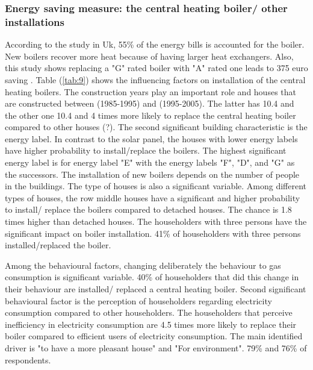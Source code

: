 \documentclass[preprint,12pt,3p]{elsarticle}
\begin{document}
\subsubsection{Energy saving measure: the central heating boiler/ other installations}

According to the study in Uk, 55\% of the energy bills is accounted for the boiler. New boilers recover more heat because of having larger heat exchangers. Also, this study shows replacing a "G" rated boiler with "A" rated one leads to 375 euro saving \citep{boiler19, Energy2019}. Table (\ref{tab:9}) shows the influencing factors on installation of the central heating boilers. The construction years play an important role and houses that are constructed between (1985-1995) and (1995-2005). The latter has 10.4 and the other one 10.4 and 4 times more likely to replace the central heating boiler compared to other houses (?). The second significant building characteristic is the energy label. In contrast to the solar panel, the houses with lower energy labels have higher probability to install/replace the boilers. The highest significant energy label is for energy label "E" with the energy labels "F", "D", and "G" as the successors. The installation of new boilers depends on the number of people in the buildings. The type of houses is also a significant variable. Among different types of houses, the row middle houses have a significant and higher probability to install/ replace the boilers compared to detached houses. The chance is 1.8 times higher than detached houses. The householders with three persons have the significant impact on boiler installation. 41\% of householders with three persons installed/replaced the boiler. 

Among the behavioural factors, changing deliberately the behaviour to gas consumption is significant variable. 40\% of householders that did this change in their behaviour are installed/ replaced a central heating boiler. Second significant behavioural factor is the perception of householders regarding electricity consumption compared to other householders. The householders that perceive inefficiency in electricity consumption are 4.5 times more likely to replace their boiler compared to efficient users of electricity consumption. The main identified driver is "to have a more pleasant house" and "For environment". 79\% and 76\% of respondents.
\end{document}
